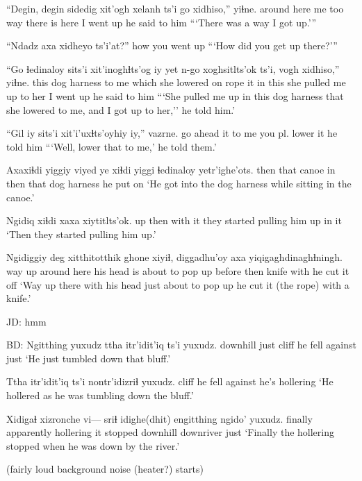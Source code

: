 \documentclass[12pt]{article}
\begin{document}
\gll ``Degin, degin sidedig xit'ogh xelanh {ts'i} go xidhiso,''   yiɬne.
{around here} {} {me too}  way   {there is} {} here {I went up} {he said to him}
\glt ```There was a way I got up.'''
\glend

\gll ``{Ndadz axa} xidheyo     ts'i'at?''
how         {you went up}
\glt ```How did you get up there?'''
\glend

\gll ``Go   ɬedinaloy   sits'i xit'inoghɬts'og  iy yet n-go xoghsitlts'ok ts'i, vogh   xidhiso,'' yiɬne.
this {dog harness} {to me} {which she lowered on rope} it in  this {she pulled me up} {} {to her} {I went up} {he said to him}
\glt ```She pulled me up in this dog harness that she lowered to me, and I got up to her,'' he told him.'
\glend

\gll ``Gil  iy   sits'i xit'i'uxɬts'oyhiy iy,'' vazrne.
{go ahead} it {to me} {you pl. lower}  it {he told him}
\glt ```Well, lower that to me,' he told them.'
\glend

\gll Axaxiɬdi yiggiy viyed ye xiɬdi yiggi ɬedinaloy   yetr'ighe'ots.
then     that   canoe in then  that  {dog harness} {he put on}
\glt `He got into the dog harness while sitting in the canoe.'
\glend

\gll Ngidiq xiɬdi xaxa    xiytitlts'ok.
up     then   {with it} {they started pulling him up in it}
\glt `Then they started pulling him up.'
\glend

\gll Ngidiggiy deg         xitthitotthik               ghone xiyiɬ,  diggadhu'oy axa  yiqigaghdinaghɬningh.
{way up}  {around here} {his head is about to pop up} before then  knife       with {he cut it off}
\glt `Way up there with his head just about to pop up he cut it (the rope) with a knife.'
\glend

JD:  hmm

BD:  
\gll Ngitthing yuxudz ttha  itr'idit'iq     ts'i yuxudz.
downhill  just   cliff {he fell against} {}     just
\glt `He just tumbled down that bluff.'
\glend

\gll Ttha  itr'idit'iq     ts'i nontr'idizriɬ yuxudz.
cliff {he fell against} {}  {he's hollering}
\glt `He hollered as he was tumbling down the bluff.'
\glend

\gll Xidigaɬ xizronche vi--- sriɬ      idighe(dhit) engitthing ngido' yuxudz.
finally apparently {} hollering {it stopped} downhill  downriver  just
\glt `Finally the hollering stopped when he was down by the river.'
\glend

(fairly loud background noise (heater?) starts)
\end{document}
